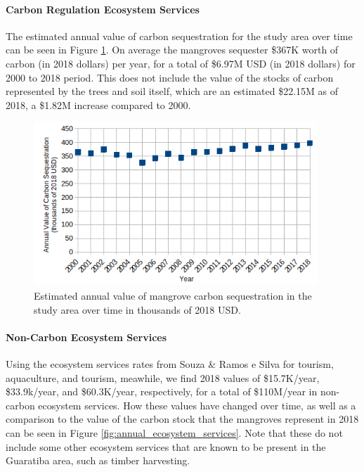 \paragraph{Carbon Regulation Ecosystem Services} \leavevmode\newline

The estimated annual value of carbon sequestration for the study area over time can be seen in Figure \ref{fig:carbon_sequestration_value}. On average the mangroves sequester \$367K worth of carbon (in 2018 dollars) per year, for a total of \$6.97M USD (in 2018 dollars) for 2000 to 2018 period. This does not include the value of the stocks of carbon represented by the trees and soil itself, which are an estimated \$22.15M as of 2018, a \$1.82M increase compared to 2000.
    
\begin{figure}[!htb] 
\centering
\includegraphics[width=0.95\textwidth]{Figures/chap4/carbon_sequestration_value.png}
\caption[Annual Value of Mangrove Carbon Sequestration]{Estimated annual value of mangrove carbon sequestration in the study area over time in thousands of 2018 USD.}
\label{fig:carbon_sequestration_value}
\end{figure}

\paragraph{Non-Carbon Ecosystem Services} \leavevmode\newline


Using the ecosystem services rates from Souza \& Ramos e Silva \cite{souzaEcologicalEconomicValuation2011} for tourism, aquaculture, and tourism, meawhile, we find 2018 values of \$15.7K/year, \$33.9k/year, and \$60.3K/year, respectively, for a total of \$110M/year in non-carbon ecosystem services. How these values have changed over time, as well as a comparison to the value of the carbon stock that the mangroves represent in 2018 can be seen in Figure \ref{fig:annual_ecosystem_services}. Note that these do not include some other ecosystem services that are known to be present in the Guaratiba area, such as timber harvesting.


